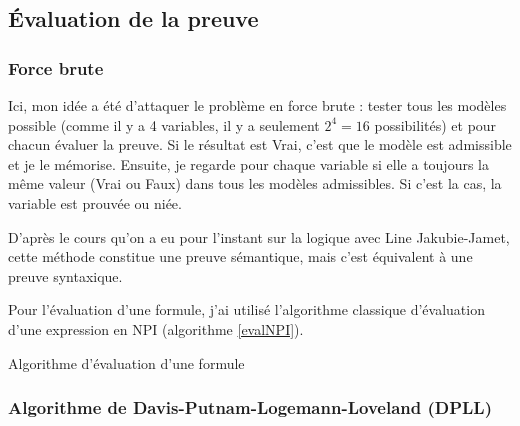 \documentclass[12pt, algo]{cours}
\begin{document}
\subsection{Évaluation de la preuve}

\subsubsection{Force brute}

Ici, mon idée a été d'attaquer le problème en force brute : tester tous les modèles possible (comme il y a 4 variables, il y a seulement $2^4=16$ possibilités) et pour chacun évaluer la preuve. Si le résultat est Vrai, c'est que le modèle est admissible et je le mémorise. Ensuite, je regarde pour chaque variable si elle a toujours la même valeur (Vrai ou Faux) dans tous les modèles admissibles. Si c'est la cas, la variable est prouvée ou niée.

\medskip
D'après le cours qu'on a eu pour l'instant sur la logique avec Line Jakubie-Jamet, cette méthode constitue une preuve sémantique, mais c'est équivalent à une preuve syntaxique.

\medskip

Pour l'évaluation d'une formule, j'ai utilisé l'algorithme classique d'évaluation d'une expression en NPI (algorithme \ref{evalNPI}).

\begin{algorithm}
\caption{Algorithme d'évaluation d'une formule}
\label{evalNPI}
\end{algorithm}

\subsubsection{Algorithme de Davis-Putnam-Logemann-Loveland (DPLL)}
\end{document}
